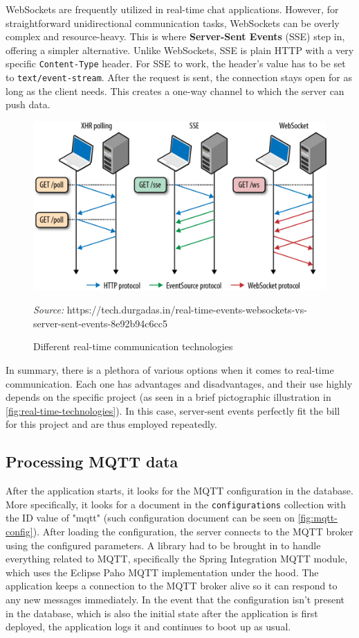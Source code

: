 \documentclass[FM,BP,EN,fonts]{tulthesis}
\begin{document}
WebSockets are frequently utilized in real-time chat applications. However, for straightforward unidirectional communication tasks, WebSockets can be overly complex and resource-heavy. This is where \textbf{Server-Sent Events} (SSE) step in, offering a simpler alternative. Unlike WebSockets, SSE is plain HTTP with a very specific \verb|Content-Type| header. For SSE to work, the header's value has to be set to \verb|text/event-stream|. After the request is sent, the connection stays open for as long as the client needs. This creates a one-way channel to which the server can push data. 

\begin{figure}[ht]
    \centering
    \includegraphics[scale=.4]{media/real-time-technologies.png}
    \caption{Different real-time communication technologies}
    \textit{Source:} https://tech.durgadas.in/real-time-events-websockets-vs-server-sent-events-8e92b94c6cc5
    \label{fig:real-time-technologies}
\end{figure}

In summary, there is a plethora of various options when it comes to real-time communication. Each one has advantages and disadvantages, and their use highly depends on the specific project (as seen in a brief pictographic illustration in \autoref{fig:real-time-technologies}). In this case, server-sent events perfectly fit the bill for this project and are thus employed repeatedly.

\subsection{Processing MQTT data}
After the application starts, it looks for the MQTT configuration in the database. More specifically, it looks for a document in the \verb|configurations| collection with the ID value of "mqtt" (such configuration document can be seen on \autoref{fig:mqtt-config}). After loading the configuration, the server connects to the MQTT broker using the configured parameters. A library had to be brought in to handle everything related to MQTT, specifically the Spring Integration MQTT module, which uses the Eclipse Paho MQTT implementation under the hood. The application keeps a connection to the MQTT broker alive so it can respond to any new messages immediately. In the event that the configuration isn't present in the database, which is also the initial state after the application is first deployed, the application logs it and continues to boot up as usual.
\end{document}
